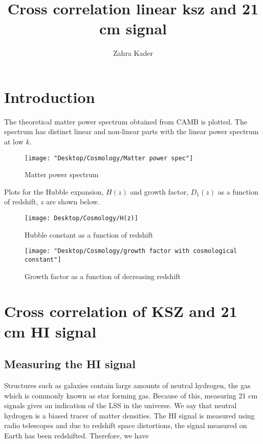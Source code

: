 \documentclass[12pt]{article}
\title{Cross correlation linear ksz and 21 cm signal}
\author{Zahra Kader}
\begin{document}
\maketitle

\begin{abstract}

\end{abstract}

\section{Introduction}

The theoretical matter power spectrum obtained from CAMB is plotted. The spectrum has distinct linear and non-linear parts with the linear power spectrum at low $k$.
\begin{figure}[h!]
	\centering
	\texttt{[image: "Desktop/Cosmology/Matter power spec"]}
	\caption{Matter power spectrum}
	\label{fig:matter-power-spec}
\end{figure}

Plots for the Hubble expansion, $H(z)$ and growth factor, $D_1(z)$ as a function of redshift, $z$ are shown below.
\begin{figure}[h!]
	\centering
	\texttt{[image: Desktop/Cosmology/H(z)]}
	\caption{Hubble constant as a function of redshift}
	\label{fig:hz}
\end{figure}

\begin{figure}[h!]
	\centering
	\texttt{[image: "Desktop/Cosmology/growth factor with cosmological constant"]}
	\caption{Growth factor as a function of decreasing redshift}
	\label{fig:growth-factor-with-cosmological-constant}
\end{figure}


\section{Cross correlation of KSZ and 21 cm HI signal}

\subsection{Measuring the HI signal}

Structures such as galaxies contain large amounts of neutral hydrogen, the gas which is commonly known as star forming gas. Because of this, measuring 21 cm signals gives an indication of the LSS in the universe. We say that neutral hydrogen is a biased tracer of matter densities. The HI signal is measured using radio telescopes and due to redshift space distortions, the signal measured on Earth has been redshifted. Therefore, we have
\end{document}
